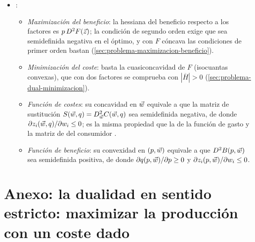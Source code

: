 \documentclass[11pt]{article}
\begin{document}
\begin{itemize}
\item {}:
  \begin{itemize}
  \item \emph{Maximización del beneficio}: la hessiana del beneficio respecto a los factores es $p\,D^2F(\vec{z})$; la condición de segundo orden exige que sea semidefinida negativa en el óptimo, y con $F$ cóncava las condiciones de primer orden bastan (\ref{sec:problema-maximizacion-beneficio}).
  \item \emph{Minimización del coste}: basta la cuasiconcavidad de $F$ (isocuantas convexas), que con dos factores se comprueba con $|\overline{H}|>0$ (\ref{sec:problema-dual-minimizacion}).
  \item \emph{Función de costes}: su concavidad en $\vec{w}$ equivale a que la matriz de sustitución $S(\vec{w},q)=D^2_{\vec{w}}C(\vec{w},q)$ sea semidefinida negativa, de donde $\partial z_i(\vec{w},q)/\partial w_i\leq 0$; es la misma propiedad que la de la función de gasto y la matriz de  del consumidor .
  \item \emph{Función de beneficio}: su convexidad en $(p,\vec{w})$ equivale a que $D^2B(p,\vec{w})$ sea semidefinida positiva, de donde $\partial q(p,\vec{w})/\partial p\geq 0$ y $\partial z_i(p,\vec{w})/\partial w_i\leq 0$.
  \end{itemize}
\end{itemize}

\section{Anexo: la dualidad en sentido estricto:\cortetitulo{} maximizar la producción con un coste dado}\label{anexo:segura}
\end{document}
